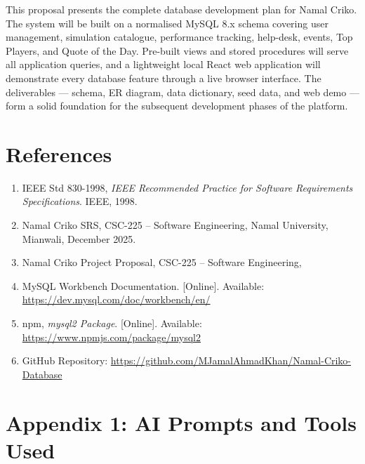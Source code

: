 \documentclass[12pt,a4paper]{article}
\begin{document}
This proposal presents the complete database development plan for Namal Criko.
The system will be built on a normalised MySQL 8.x schema covering user management,
simulation catalogue, performance tracking, help-desk, events, Top Players, and
Quote of the Day. Pre-built views and stored procedures will serve all application
queries, and a lightweight local React web application will demonstrate every
database feature through a live browser interface. The deliverables --- schema,
ER diagram, data dictionary, seed data, and web demo --- form a solid foundation
for the subsequent development phases of the platform.

\section{References}

\begin{enumerate}[leftmargin=1.5em]
    \item IEEE Std 830-1998, \textit{IEEE Recommended Practice for Software
    Requirements Specifications}. IEEE, 1998.
    \item Namal Criko SRS, CSC-225 -- Software Engineering, Namal University,
    Mianwali, December 2025.
    \item Namal Criko Project Proposal, CSC-225 -- Software Engineering,
    \item MySQL Workbench Documentation. [Online]. Available:
    \url{https://dev.mysql.com/doc/workbench/en/}
    \item npm, \textit{mysql2 Package}. [Online]. Available:
    \url{https://www.npmjs.com/package/mysql2}
    \item GitHub Repository:
    \url{https://github.com/MJamalAhmadKhan/Namal-Criko-Database}
\end{enumerate}

\appendix
\section*{Appendix 1: AI Prompts and Tools Used}
\end{document}
